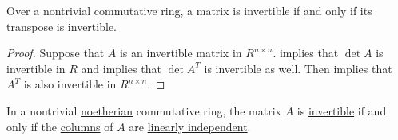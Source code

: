 \begin{corollary}\label{thm:matrix_invertible_iff_transpose_invertible}
  Over a nontrivial commutative ring, a matrix is invertible if and only if its transpose is invertible.
\end{corollary}
\begin{proof}
  Suppose that \( A \) is an invertible matrix in \( R^{n \times n} \).  implies that \( \det A \) is invertible in \( R \) and  implies that \( \det A^T \) is invertible as well. Then  implies that \( A^T \) is also invertible in \( R^{n \times n} \).
\end{proof}

\begin{proposition}\label{matrix_invertibility_via_columns}
  In a nontrivial \hyperref[def:noetherian_semiring]{noetherian} commutative ring, the matrix \( A \) is \hyperref[def:inverse_matrix]{invertible} if and only if the \hyperref[def:block_matrix]{columns} of \( A \) are \hyperref[def:linear_dependence]{linearly independent}.
\end{proposition}
